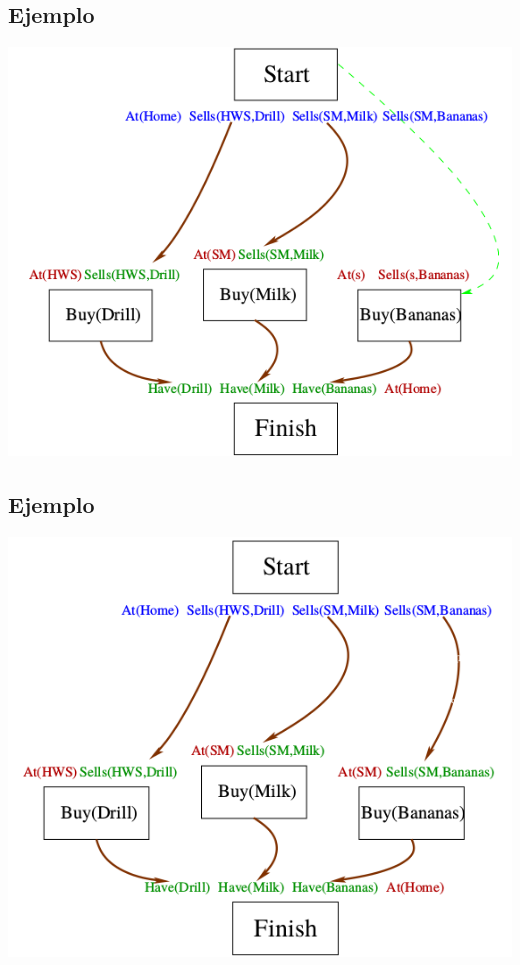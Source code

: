 \documentclass[11pt]{article}
\begin{document}
\subsection*{Ejemplo}
\label{sec:org51cfdde}

\begin{center}
\includegraphics[width=.9\linewidth]{imagenes/pop7.png}
\end{center}

\subsection*{Ejemplo}
\label{sec:org34418da}

\begin{center}
\includegraphics[width=.9\linewidth]{imagenes/pop8.png}
\end{center}
\end{document}
